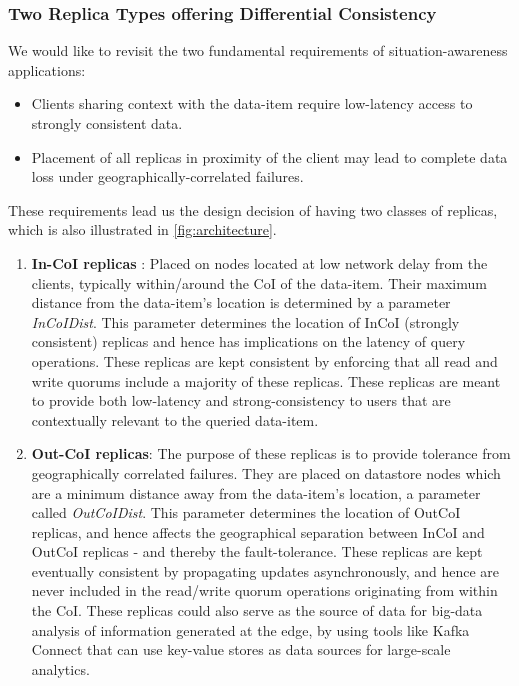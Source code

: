 \subsubsection{Two Replica Types offering Differential Consistency}
\label{sec:two_replica_types}
We would like to revisit the two fundamental requirements of situation-awareness applications:
\begin{itemize}
\item Clients sharing context with the data-item require low-latency access to strongly consistent data.
\item Placement of all replicas in proximity of the client may lead to complete data loss under geographically-correlated failures.
\end{itemize}

These requirements lead us the design decision of having two classes of replicas, which is also illustrated in \cref{fig:architecture}.
\begin{enumerate}
\item \textbf{In-CoI replicas} : Placed on nodes located at low network delay from the clients, typically within/around the CoI of the data-item.  Their maximum distance from the data-item's location is determined by a parameter \emph{InCoIDist}. This parameter determines the location of InCoI (strongly consistent) replicas and hence has implications on the latency of query operations. These replicas are kept consistent by enforcing that all read and write quorums include a majority of these replicas. These replicas are meant to provide both low-latency and strong-consistency to users that are contextually relevant to the queried data-item.
\item \textbf{Out-CoI replicas}: The purpose of these replicas is to provide tolerance from geographically correlated failures. They are placed on datastore nodes which are a minimum distance away from the data-item's location, a parameter called \emph{OutCoIDist}. This parameter determines the location of OutCoI replicas, and hence affects the geographical separation between InCoI and OutCoI replicas - and thereby the fault-tolerance. These replicas are kept eventually consistent by propagating updates asynchronously, and hence are never included in the read/write quorum operations originating from within the CoI. These replicas could also serve as the source of data for big-data analysis of information generated at the edge, by using tools like Kafka Connect \cite{kafkaconnect} that can use key-value stores as data sources for large-scale analytics.
\end{enumerate}

